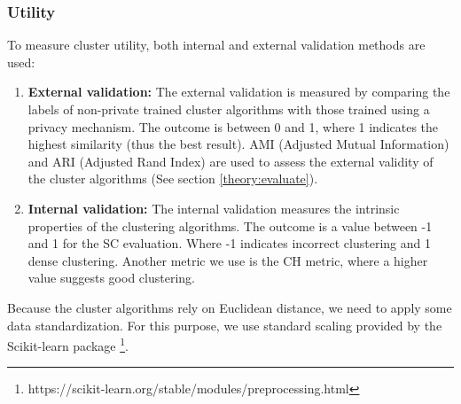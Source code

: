 \subsubsection*{Utility}
To measure cluster utility, both internal and external validation methods are used:
{}
\begin{enumerate}
  \item \textbf{External validation: }
        The external validation is measured by comparing the labels of non-private trained cluster algorithms with those trained using a privacy mechanism.
        The outcome is between 0 and 1, where 1 indicates the highest similarity (thus the best result).
        AMI (Adjusted Mutual Information) and ARI (Adjusted Rand Index) are used to assess the external validity of the cluster algorithms (See section \ref{theory:evaluate}).
  \item \textbf{Internal validation: }
        The internal validation measures the intrinsic properties of the clustering algorithms.
        The outcome is a value between -1 and 1 for the SC evaluation.
        Where -1 indicates incorrect clustering and 1 dense clustering.
        Another metric we use is the CH metric, where a higher value suggests good clustering.
\end{enumerate}
Because the cluster algorithms rely on Euclidean distance, we need to apply some data standardization.
For this purpose, we use standard scaling provided by the Scikit-learn package \footnote{https://scikit-learn.org/stable/modules/preprocessing.html}.

